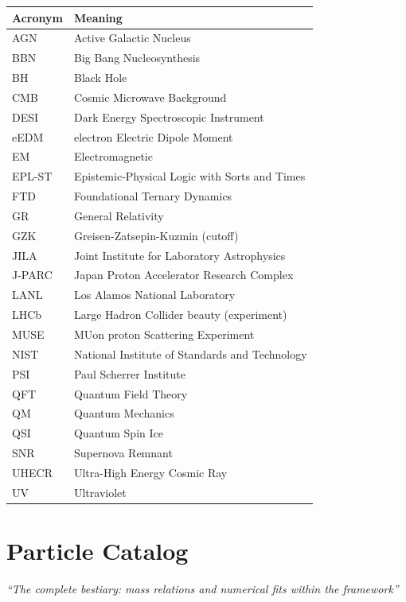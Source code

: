 \documentclass[
  11pt,
  letterpaper,
  twoside,
  openany]{book}
\begin{document}
\begin{longtable}[]{@{}ll@{}}
\toprule\noalign{}
Acronym & Meaning \\
\midrule\noalign{}
\endhead
\bottomrule\noalign{}
\endlastfoot
AGN & Active Galactic Nucleus \\
BBN & Big Bang Nucleosynthesis \\
BH & Black Hole \\
CMB & Cosmic Microwave Background \\
DESI & Dark Energy Spectroscopic Instrument \\
eEDM & electron Electric Dipole Moment \\
EM & Electromagnetic \\
EPL-ST & Epistemic-Physical Logic with Sorts and Times \\
FTD & Foundational Ternary Dynamics \\
GR & General Relativity \\
GZK & Greisen-Zatsepin-Kuzmin (cutoff) \\
JILA & Joint Institute for Laboratory Astrophysics \\
J-PARC & Japan Proton Accelerator Research Complex \\
LANL & Los Alamos National Laboratory \\
LHCb & Large Hadron Collider beauty (experiment) \\
MUSE & MUon proton Scattering Experiment \\
NIST & National Institute of Standards and Technology \\
PSI & Paul Scherrer Institute \\
QFT & Quantum Field Theory \\
QM & Quantum Mechanics \\
QSI & Quantum Spin Ice \\
SNR & Supernova Remnant \\
UHECR & Ultra-High Energy Cosmic Ray \\
UV & Ultraviolet \\
\end{longtable}

\chapter{Particle Catalog}\label{sec-particle-catalog}

\emph{``The complete bestiary: mass relations and numerical fits within
the framework''}
\end{document}
